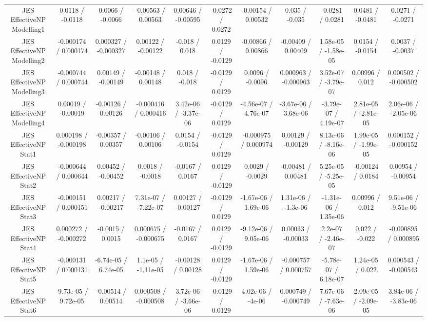 {\begin{landscape}
\begin{longtable}{@{\extracolsep{\fill}}| *{11}{c|}}
  JES EffectiveNP Modelling1 & 0.0118 / -0.0118 & 0.0066 / -0.0066 & -0.00563 / 0.00563 & 0.00646 / -0.00595 & -0.0272 / 0.0272 & -0.00154 / 0.00532 & 0.035 / -0.035 & -0.0281 / 0.0281 & 0.0481 / -0.0481 & 0.0271 / -0.0271 \\ 
  JES EffectiveNP Modelling2 & -0.000174 / 0.000174 & 0.000327 / -0.000327 & 0.00122 / -0.00122 & -0.018 / 0.018 & 0.0129 / -0.0129 & -0.00866 / 0.00866 & -0.00409 / 0.00409 & 1.58e-05 / -1.58e-05 & 0.0154 / -0.0154 & 0.0037 / -0.0037 \\ 
  JES EffectiveNP Modelling3 & -0.000744 / 0.000744 & 0.00149 / -0.00149 & -0.00148 / 0.00148 & 0.018 / -0.018 & -0.0129 / 0.0129 & 0.0096 / -0.0096 & 0.000963 / -0.000963 & 3.52e-07 / -3.79e-07 & 0.00996 / 0.012 & 0.000502 / -0.000502 \\ 
  JES EffectiveNP Modelling4 & 0.00019 / -0.00019 & -0.00126 / 0.00126 & -0.000416 / 0.000416 & 3.42e-06 / -3.37e-06 & -0.0129 / 0.0129 & -4.56e-07 / 4.76e-07 & -3.67e-06 / 3.68e-06 & -3.79e-07 / 4.19e-07 & 2.81e-05 / -2.81e-05 & 2.06e-06 / -2.05e-06 \\ 
  JES EffectiveNP Stat1 & 0.000198 / -0.000198 & -0.00357 / 0.00357 & -0.00106 / 0.00106 & 0.0154 / -0.0154 & -0.0129 / 0.0129 & -0.000975 / 0.000974 & 0.00129 / -0.00129 & 8.13e-06 / -8.16e-06 & 1.99e-05 / -1.99e-05 & 0.000152 / -0.000152 \\ 
  JES EffectiveNP Stat2 & -0.000644 / 0.000644 & 0.00452 / -0.00452 & 0.0018 / -0.0018 & -0.0167 / 0.0167 & 0.0129 / -0.0129 & 0.0029 / -0.0029 & -0.00481 / 0.00481 & 5.25e-05 / -5.25e-05 & -0.00124 / 0.0184 & 0.00954 / -0.00954 \\ 
  JES EffectiveNP Stat3 & -0.000151 / 0.000151 & 0.00217 / -0.00217 & 7.31e-07 / -7.22e-07 & 0.00127 / -0.00127 & -0.0129 / 0.0129 & -1.67e-06 / 1.69e-06 & 1.31e-06 / -1.3e-06 & -1.31e-06 / 1.35e-06 & 0.00996 / 0.012 & 9.51e-06 / -9.51e-06 \\ 
  JES EffectiveNP Stat4 & 0.000272 / -0.000272 & -0.0015 / 0.0015 & 0.000675 / -0.000675 & -0.0167 / 0.0167 & 0.0129 / -0.0129 & -9.12e-06 / 9.05e-06 & 0.00033 / -0.00033 & 2.2e-07 / -2.46e-07 & 0.022 / -0.022 & -0.000895 / 0.000895 \\ 
  JES EffectiveNP Stat5 & -0.000131 / 0.000131 & -6.74e-05 / 6.74e-05 & 1.1e-05 / -1.11e-05 & -0.00128 / 0.00128 & 0.0129 / -0.0129 & -1.67e-06 / 1.59e-06 & -0.000757 / 0.000757 & -5.78e-07 / 6.18e-07 & 1.24e-05 / 0.022 & 0.000543 / -0.000543 \\ 
  JES EffectiveNP Stat6 & -9.73e-05 / 9.72e-05 & -0.00514 / 0.00514 & 0.000508 / -0.000508 & 3.72e-06 / -3.66e-06 & -0.0129 / 0.0129 & 4.02e-06 / -4e-06 & 0.000749 / -0.000749 & 7.67e-06 / -7.63e-06 & 2.09e-05 / -2.09e-05 & 3.84e-06 / -3.83e-06 \\ 

\end{longtable}
\end{landscape}}
